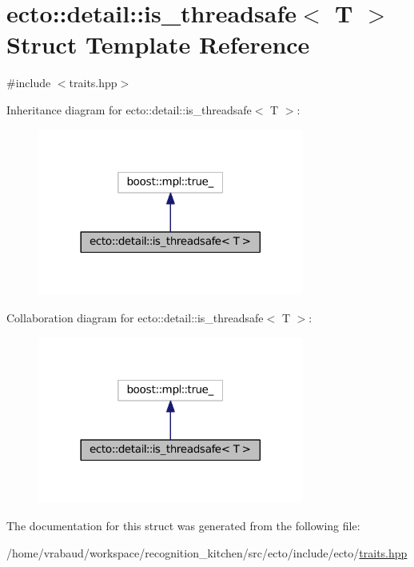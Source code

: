 \hypertarget{structecto_1_1detail_1_1is__threadsafe}{}\section{ecto\+:\+:detail\+:\+:is\+\_\+threadsafe$<$ T $>$ Struct Template Reference}
\label{structecto_1_1detail_1_1is__threadsafe}


{\ttfamily \#include $<$traits.\+hpp$>$}



Inheritance diagram for ecto\+:\+:detail\+:\+:is\+\_\+threadsafe$<$ T $>$\+:\nopagebreak
\begin{figure}[H]
\begin{center}
\leavevmode
\includegraphics[width=248pt]{structecto_1_1detail_1_1is__threadsafe__inherit__graph}
\end{center}
\end{figure}


Collaboration diagram for ecto\+:\+:detail\+:\+:is\+\_\+threadsafe$<$ T $>$\+:\nopagebreak
\begin{figure}[H]
\begin{center}
\leavevmode
\includegraphics[width=248pt]{structecto_1_1detail_1_1is__threadsafe__coll__graph}
\end{center}
\end{figure}


The documentation for this struct was generated from the following file\+:\begin{DoxyCompactItemize}
\item 
/home/vrabaud/workspace/recognition\+\_\+kitchen/src/ecto/include/ecto/\hyperlink{traits_8hpp}{traits.\+hpp}\end{DoxyCompactItemize}
